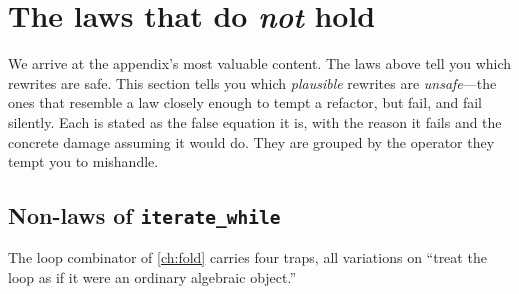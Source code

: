 \section{The laws that do \emph{not} hold}
\label{sec:nonlaws}

We arrive at the appendix's most valuable content. The laws above tell you which
rewrites are safe. This section tells you which \emph{plausible} rewrites are
\emph{unsafe}---the ones that resemble a law closely enough to tempt a refactor, but
fail, and fail silently. Each is stated as the false equation it is, with the reason
it fails and the concrete damage assuming it would do. They are grouped by the
operator they tempt you to mishandle.

\subsection{Non-laws of \texttt{iterate\_while}}
\label{sec:nlloop}

The loop combinator of \cref{ch:fold} carries four traps, all variations on ``treat
the loop as if it were an ordinary algebraic object.''

